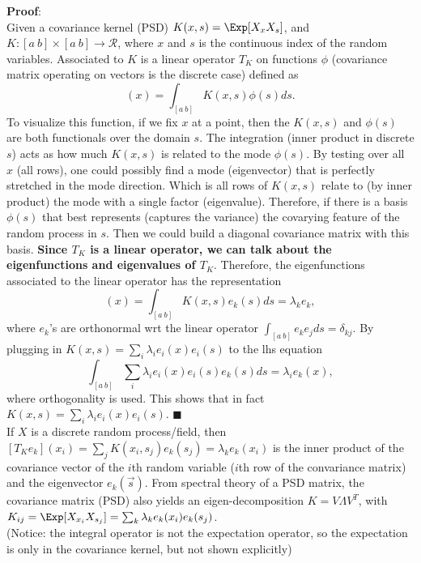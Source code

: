     {\bf Proof}: \\ 
    Given a covariance kernel (PSD) $K(x,s) = \Exp[X_{x}X_{s}]$, 
    and $K: [a \ b] \times [a \ b] \rightarrow \mathcal{R}$, 
    where $x$ and $s$ is the continuous index of the random variables.  
    Associated to $K$ is a linear operator $T_K$ on functions $\phi$ (covariance matrix operating on vectors is the discrete case) defined as 
    \begin{equation} 
        [T_K \phi](x) = \int_{[a \ b]} K(x,s) \phi(s) ds.  
    \end{equation} 
    To visualize this function, if we fix $x$ at a point, then the $K(x,s)$ and $\phi(s)$ are both functionals over the domain $s$.  
    The integration (inner product in discrete $s$) acts as how much $K(x,s)$ is related to the mode $\phi(s)$.  
    By testing over all $x$ (all rows), one could possibly find a mode (eigenvector) that is perfectly stretched in the mode direction.  
    Which is all rows of $K(x,s)$ relate to (by inner product) the mode with a single factor (eigenvalue).  
    Therefore, if there is a basis $\phi(s)$ that best represents (captures the variance) the covarying feature of the random process in $s$.  
    Then we could build a diagonal covariance matrix with this basis.  
    {\bf Since $T_K$ is a linear operator, we can talk about the eigenfunctions and eigenvalues of $T_K$}.  
    Therefore, the eigenfunctions associated to the linear operator has the representation 
    \begin{equation} 
        [T_K e_k](x) = \int_{[a \ b]} K(x,s) e_k(s) ds = \lambda_k e_k, 
    \end{equation} 
    where $e_k$'s are orthonormal wrt the linear operator $\int_{[a \ b]} e_k e_j ds = \delta_{kj}$.  
    By plugging in $K(x,s) = \sum_i \lambda_i e_i(x) e_i(s)$ to the lhs equation 
    \begin{equation} 
        \int_{[a \ b]} \sum_i \lambda_i e_i(x) e_i(s) e_k(s) ds = \lambda_i e_k(x), 
    \end{equation} 
    where orthogonality is used.  
    This shows that in fact $K(x,s) = \sum_i \lambda_i e_i(x) e_i(s)$. 
    $\blacksquare$ \\ 
    If $X$ is a discrete random process/field, then 
    $[T_K e_k](x_i) = \sum_j K(x_i,s_j) e_k(s_j) = \lambda_k e_k(x_i)$ 
    is the inner product of the covariance vector of the $i$th random variable
    ($i$th row of the convariance matrix) and the eigenvector $e_k( \vec{s})$.  
    From spectral theory of a PSD matrix, the covariance matrix (PSD) also yields an 
    eigen-decomposition $K = V\Lambda V^T$, with $K_{ij} = \Exp[X_{x_i}X_{s_j}] = \sum_k \lambda_k e_k(x_i) e_k(s_j) $. \\ 
    (Notice: the integral operator is not the expectation operator, so the expectation is only in the covariance kernel, but not shown explicitly) \\
    
